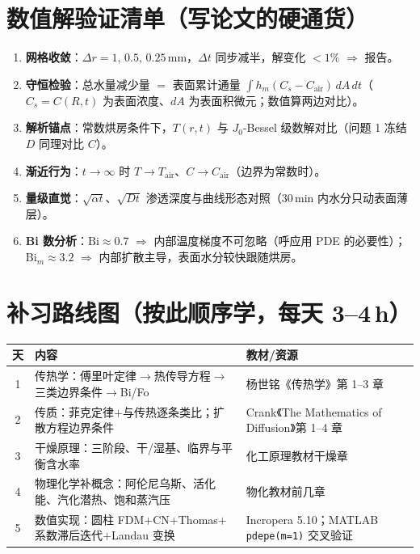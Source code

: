\documentclass[12pt,a4paper]{ctexart}
\begin{document}
\section{数值解验证清单（写论文的硬通货）}

\begin{enumerate}[leftmargin=2.5em]
\item \textbf{网格收敛}：$\Delta r=1,\,0.5,\,0.25$\,mm，$\Delta t$ 同步减半，解变化 $<1\%$ $\Rightarrow$ 报告。
\item \textbf{守恒检验}：总水量减少量 $=$ 表面累计通量 $\int h_m(C_s-C_{\mathrm{air}})\,dA\,dt$（$C_s=C(R,t)$ 为表面浓度、$dA$ 为表面积微元；数值算两边对比）。
\item \textbf{解析锚点}：常数烘房条件下，$T(r,t)$ 与 $J_0$-Bessel 级数解对比（问题 1 冻结 $D$ 同理对比 $C$）。
\item \textbf{渐近行为}：$t\to\infty$ 时 $T\to T_{\mathrm{air}}$、$C\to C_{\mathrm{air}}$（边界为常数时）。
\item \textbf{量级直觉}：$\sqrt{\alpha t}$、$\sqrt{Dt}$ 渗透深度与曲线形态对照（30\,min 内水分只动表面薄层）。
\item \textbf{Bi 数分析}：$\mathrm{Bi}\approx0.7$ $\Rightarrow$ 内部温度梯度不可忽略（呼应用 PDE 的必要性）；$\mathrm{Bi}_m\approx3.2$ $\Rightarrow$ 内部扩散主导，表面水分较快跟随烘房。
\end{enumerate}

\section{补习路线图（按此顺序学，每天 3--4\,h）}

\begin{center}
\begin{tabular}{cll}
\toprule
天 & 内容 & 教材/资源 \\
\midrule
1 & 传热学：傅里叶定律$\to$热传导方程$\to$三类边界条件$\to$Bi/Fo & 杨世铭《传热学》第 1--3 章 \\
2 & 传质：菲克定律$+$与传热逐条类比；扩散方程边界条件 & Crank《The Mathematics of Diffusion》第 1--4 章 \\
3 & 干燥原理：三阶段、干/湿基、临界与平衡含水率 & 化工原理教材干燥章 \\
4 & 物理化学补概念：阿伦尼乌斯、活化能、汽化潜热、饱和蒸汽压 & 物化教材前几章 \\
5 & 数值实现：圆柱 FDM$+$CN$+$Thomas$+$系数滞后迭代$+$Landau 变换 & Incropera 5.10；MATLAB \texttt{pdepe(m=1)} 交叉验证 \\
\bottomrule
\end{tabular}
\end{center}
\end{document}
